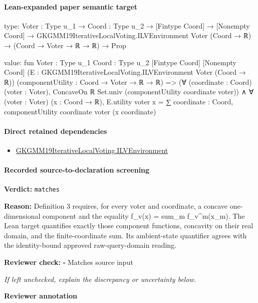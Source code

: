 \documentclass[10pt]{article}
\newcommand{\reviewerbox}{%
  \par\noindent\fbox{\parbox{0.96\linewidth}{\rule{0pt}{0.38in}}}\par
}
\newcommand{\reviewmatch}[1]{%
  \par\noindent\textbf{Reviewer check:} $\square$\; #1\par
  \noindent\emph{If left unchecked, explain the discrepancy or uncertainty below.}\par
}
\begin{document}
\paragraph{Lean-expanded paper semantic target}
\begin{ReviewVerbatim}
type:
{Voter : Type u_1} →
  {Coord : Type u_2} →
    [Fintype Coord] →
      [Nonempty Coord] → GKGMM19IterativeLocalVoting.ILVEnvironment Voter (Coord → ℝ) → (Coord → Voter → ℝ → ℝ) → Prop

value:
fun {Voter : Type u_1} {Coord : Type u_2} [Fintype Coord] [Nonempty Coord]
    (E : GKGMM19IterativeLocalVoting.ILVEnvironment Voter (Coord → ℝ)) (componentUtility : Coord → Voter → ℝ → ℝ) =>
  (∀ (coordinate : Coord) (voter : Voter), ConcaveOn ℝ Set.univ (componentUtility coordinate voter)) ∧
    ∀ (voter : Voter) (x : Coord → ℝ),
      E.utility voter x = ∑ coordinate : Coord, componentUtility coordinate voter (x coordinate)
\end{ReviewVerbatim}

\paragraph{Direct retained dependencies}
\begin{itemize}\raggedright
\item \hyperlink{governing-declaration-df2ca62df1846667}{GKGMM19\allowbreak{}Iterative\allowbreak{}Local\allowbreak{}Voting.\allowbreak{}ILV\allowbreak{}Environment}
\end{itemize}
\paragraph{Recorded source-to-declaration screening}
\textbf{Verdict:} \texttt{matches}
\\
{\raggedright
\textbf{Reason:} Definition 3 requires, for every voter and coordinate, a concave one-\allowbreak{}dimensional component and the equality f\_\allowbreak{}v(x) = sum\_\allowbreak{}m f\_\allowbreak{}v\textasciicircum{}m(x\_\allowbreak{}m).\allowbreak{} The Lean target quantifies exactly those component functions, concavity on their real domain, and the finite-\allowbreak{}coordinate sum.\allowbreak{} Its ambient-\allowbreak{}state quantifier agrees with the identity-\allowbreak{}bound approved raw-\allowbreak{}query-\allowbreak{}domain reading.\allowbreak{}
\par}
\reviewmatch{Matches source input}
\noindent\textbf{Reviewer annotation}\par
\reviewerbox
\clearpage
\hypertarget{paper-prerequisite-22a52e92b32377b5}{}
\end{document}

